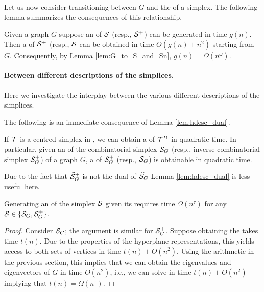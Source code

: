 Let us now consider transitioning between $G$ and the \hdesc of a simplex.  The following lemma summarizes the consequences of this relationship. 

\begin{lemma}
	Given a graph $G$ suppose an \hdesc of $\mathcal{S}$ (resp., $\mathcal{S}^+$) can be generated in time $g(n)$. Then a \vdesc of $\mathcal{S}^+$ (resp., $\mathcal{S}$ can be obtained in time $O(g(n) + n^2)$ starting from $G$. Consequently, by Lemma \ref{lem:G_to_S_and_Sn}, $g(n)=\Omega(n^\omega)$. 
\end{lemma}


\paragraph{Between different descriptions of the simplices.}

Here we investigate  the interplay between the various different descriptions of the simplices. 


The following is an immediate consequence of Lemma \ref{lem:hdesc_dual}.  

\begin{corollary}
	\label{cor:hdesc_S_to_S+}
	If $\mathcal{T}$ is a centred simplex in \hdesc, we can obtain a \vdesc of $\mathcal{T}^D$ in quadratic time. In particular, given  an \hdesc of the combinatorial simplex $\mathcal{S}_G$ (resp., inverse combinatorial  simplex $\mathcal{S}_G^+$)  of a graph $G$, a \vdesc of $\mathcal{S}_G^+$ (resp., $\mathcal{S}_G$)  is obtainable in quadratic time. 
\end{corollary}

Due to the fact that $\widehat{\mathcal{S}}_G^+$ is not the dual of $\widehat{\mathcal{S}}_G$ Lemma \ref{lem:hdesc_dual} is less useful here.  

\begin{lemma}
	\label{lem:hdesc_to_vdesc}
	Generating an \vdesc of the simplex $\mathcal{S}$ given its \hdesc requires time $\Omega(n^\tau)$ for any $\mathcal{S}\in\{\mathcal{S}_G,\mathcal{S}_G^+\}$. 
\end{lemma}
\begin{proof}
	Consider $\mathcal{S}_G$; the argument is similar for $\mathcal{S}_G^+$. Suppose obtaining the \hdesc takes time $t(n)$. Due to the properties of the hyperplane representations, this yields access to both sets of vertices in time $t(n)+O(n^2)$. Using the arithmetic in the previous section, this implies that we can obtain the eigenvalues and eigenvectors of $G$ in time $O(n^2)$, i.e., we can solve \lapdecomp in time $t(n)+O(n^2)$ implying that $t(n)=\Omega(n^\tau)$. 
\end{proof}






